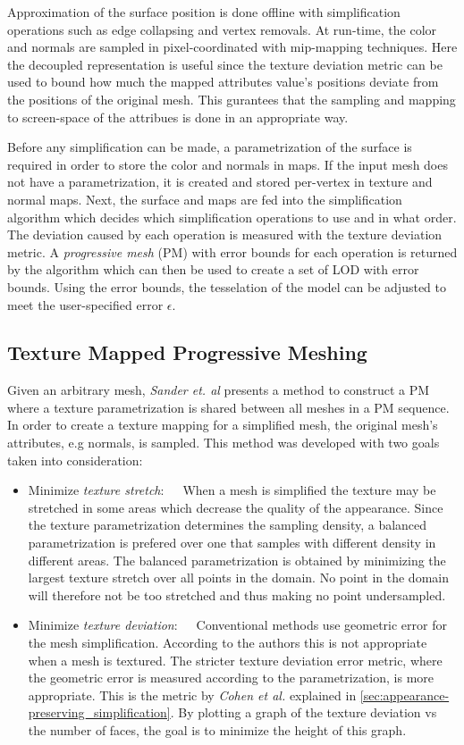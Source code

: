Approximation of the surface position is done offline with simplification operations such as edge collapsing and vertex removals. At run-time, the color and normals are sampled in pixel-coordinated with mip-mapping techniques. Here the decoupled representation is useful since the texture deviation metric can be used to bound how much the mapped attributes value's positions deviate from the positions of the original mesh. This gurantees that the sampling and mapping to screen-space of the attribues is done in an appropriate way.

Before any simplification can be made, a parametrization of the surface is required in order to store the color and normals in maps. If the input mesh does not have a parametrization, it is created and stored per-vertex in texture and normal maps. Next, the surface and maps are fed into the simplification algorithm which decides which simplification operations to use and in what order. The deviation caused by each operation is measured with the texture deviation metric. A \emph{progressive mesh} (PM) with error bounds for each operation is returned by the algorithm which can then be used to create a set of LOD with error bounds. Using the error bounds, the tesselation of the model can be adjusted to meet the user-specified error $\epsilon$.

\subsection{Texture Mapped Progressive Meshing} \label{sec:texture_mapped_progressive_meshing}
Given an arbitrary mesh, \emph{Sander et. al} \cite{sander2001texture} presents a method to construct a PM where a texture parametrization is shared between all meshes in a PM sequence. In order to create a texture mapping for a simplified mesh, the original mesh's attributes, e.g normals, is sampled. This method was developed with two goals taken into consideration:
\begin{itemize}
\item{Minimize \emph{texture stretch}:}~~~When a mesh is simplified the texture may be stretched in some areas which decrease the quality of the appearance. Since the texture parametrization determines the sampling density, a balanced parametrization is prefered over one that samples with different density in different areas. The balanced parametrization is obtained by minimizing the largest texture stretch over all points in the domain. No point in the domain will therefore not be too stretched and thus making no point undersampled. 
\item{Minimize \emph{texture deviation}:}~~~Conventional methods use geometric error for the mesh simplification. According to the authors this is not appropriate when a mesh is textured. The stricter texture deviation error metric, where the geometric error is measured according to the parametrization, is more appropriate. This is the metric by \emph{Cohen et al.} \cite{cohen1998appearance} explained in \ref{sec:appearance-preserving_simplification}. By plotting a graph of the texture deviation vs the number of faces, the goal is to minimize the height of this graph.
\end{itemize}

